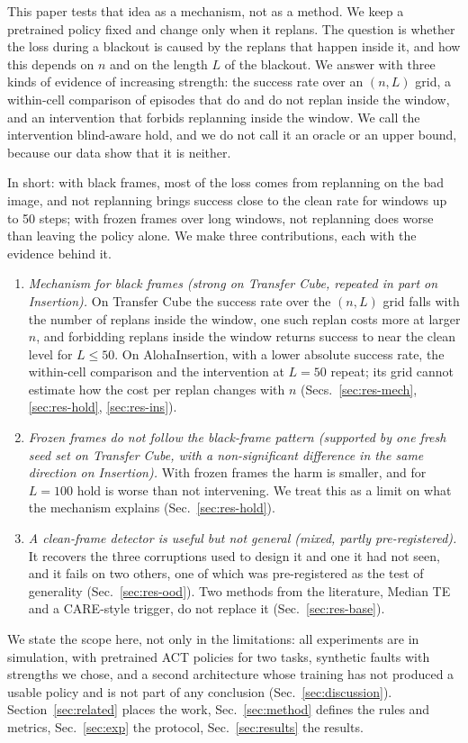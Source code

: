 \documentclass[11pt]{article}
\begin{document}
This paper tests that idea as a mechanism, not as a method. We keep a pretrained policy fixed and change only when it replans. The question is whether the loss during a blackout is caused by the replans that happen inside it, and how this depends on $n$ and on the length $L$ of the blackout. We answer with three kinds of evidence of increasing strength: the success rate over an $(n,L)$ grid, a within-cell comparison of episodes that do and do not replan inside the window, and an intervention that forbids replanning inside the window. We call the intervention blind-aware hold, and we do not call it an oracle or an upper bound, because our data show that it is neither.

In short: with black frames, most of the loss comes from replanning on the bad image, and not replanning brings success close to the clean rate for windows up to 50 steps; with frozen frames over long windows, not replanning does worse than leaving the policy alone. We make three contributions, each with the evidence behind it.
\begin{enumerate}\itemsep0pt
\item \emph{Mechanism for black frames (strong on Transfer Cube, repeated in part on Insertion).} On Transfer Cube the success rate over the $(n,L)$ grid falls with the number of replans inside the window, one such replan costs more at larger $n$, and forbidding replans inside the window returns success to near the clean level for $L\le 50$. On AlohaInsertion, with a lower absolute success rate, the within-cell comparison and the intervention at $L{=}50$ repeat; its grid cannot estimate how the cost per replan changes with $n$ (Secs.~\ref{sec:res-mech}, \ref{sec:res-hold}, \ref{sec:res-ins}).
\item \emph{Frozen frames do not follow the black-frame pattern (supported by one fresh seed set on Transfer Cube, with a non-significant difference in the same direction on Insertion).} With frozen frames the harm is smaller, and for $L{=}100$ hold is worse than not intervening. We treat this as a limit on what the mechanism explains (Sec.~\ref{sec:res-hold}).
\item \emph{A clean-frame detector is useful but not general (mixed, partly pre-registered).} It recovers the three corruptions used to design it and one it had not seen, and it fails on two others, one of which was pre-registered as the test of generality (Sec.~\ref{sec:res-ood}). Two methods from the literature, Median TE and a CARE-style trigger, do not replace it (Sec.~\ref{sec:res-base}).
\end{enumerate}
We state the scope here, not only in the limitations: all experiments are in simulation, with pretrained ACT policies for two tasks, synthetic faults with strengths we chose, and a second architecture whose training has not produced a usable policy and is not part of any conclusion (Sec.~\ref{sec:discussion}). Section~\ref{sec:related} places the work, Sec.~\ref{sec:method} defines the rules and metrics, Sec.~\ref{sec:exp} the protocol, Sec.~\ref{sec:results} the results.
\end{document}
